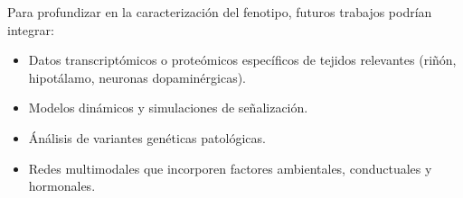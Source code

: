 Para profundizar en la caracterización del fenotipo, futuros trabajos podrían integrar:
\begin{itemize}
    \item Datos transcriptómicos o proteómicos específicos de tejidos relevantes (riñón, hipotálamo, neuronas dopaminérgicas).
    \item Modelos dinámicos y simulaciones de señalización.
    \item Ánálisis de variantes genéticas patológicas.
    \item Redes multimodales que incorporen factores ambientales, conductuales y hormonales.
\end{itemize}